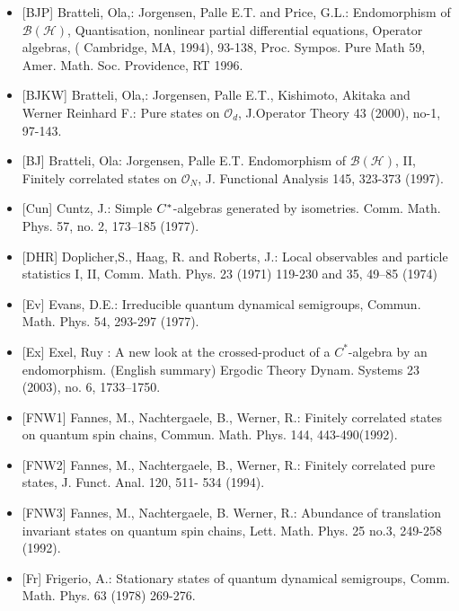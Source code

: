 \documentclass[a4paper,Haag duality]{mathscan}
\theoremstyle{definition}
\newcommand{\cal}{\mathcal}
\newcommand{\clh}{{\cal H}}
\newcommand{\clo}{{\cal O}}
\newcommand{\clb}{{\cal B}}
\begin{document}
\begin{itemize}
\item{[BJP]} Bratteli, Ola,: Jorgensen, Palle E.T. and Price, G.L.: 
Endomorphism of $\clb(\clh)$, Quantisation, nonlinear partial differential 
equations, Operator algebras, ( Cambridge, MA, 1994), 93-138, Proc. Sympos.
Pure Math 59, Amer. Math. Soc. Providence, RT 1996.

\item{[BJKW]} Bratteli, Ola,: Jorgensen, Palle E.T., Kishimoto, Akitaka and
Werner Reinhard F.: Pure states on $\clo_d$, J.Operator Theory 43 (2000),
no-1, 97-143.    

\item{[BJ]} Bratteli, Ola: Jorgensen, Palle E.T. Endomorphism of $\clb(\clh)$, II, 
Finitely correlated states on $\clo_N$, J. Functional Analysis 145, 323-373 (1997). 

\item{[Cun]} Cuntz, J.: Simple $C\sp*$-algebras generated by isometries. Comm. Math. Phys. 57, 
no. 2, 173--185 (1977).  

\item{[DHR]} Doplicher,S., Haag, R. and Roberts, J.: Local observables and particle statistics I, II, Comm. Math. Phys. 23 (1971) 119-230 and 35, 49–85 (1974)

\item{[Ev]} Evans, D.E.: Irreducible quantum dynamical
semigroups, Commun. Math. Phys. 54, 293-297 (1977).

\item{[Ex]} Exel, Ruy : A new look at the crossed-product of a $C^*$-algebra by an endomorphism. (English summary)
Ergodic Theory Dynam. Systems 23 (2003), no. 6, 1733–1750.

\item{[FNW1]} Fannes, M., Nachtergaele, B., Werner, R.: Finitely correlated states on quantum spin chains,
Commun. Math. Phys. 144, 443-490(1992).

\item{[FNW2]} Fannes, M., Nachtergaele, B., Werner, R.: Finitely correlated pure states, J. Funct. Anal. 120, 511-
534 (1994). 

\item{[FNW3]} Fannes, M., Nachtergaele, B. Werner, R.: Abundance of translation invariant states on quantum spin chains, Lett. Math. Phys. 25 no.3, 249-258 (1992).

\item{[Fr]} Frigerio, A.: Stationary states of quantum dynamical semigroups, Comm. Math. Phys. 63 (1978) 269-276.


\end{itemize}
\end{document}
